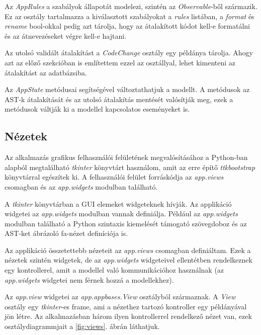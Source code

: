 Az \emph{AppRules} a szabályok állapotát modelezi, szintén az \emph{Observable}-ből
származik.
Ez az osztály tartalmazza a kiválasztott szabályokat a \emph{rules} listában,
a \emph{format} és \emph{rename} bool-okkal pedig azt tárolja, hogy az átalakított
kódot kell-e formatálni és az átnevezéseket végre kell-e hajtani.

\pagebreak

Az utolsó validált átalakítást a \emph{CodeChange} osztály egy példánya tárolja.
Ahogy azt az előző szekcióban is említettem ezzel az osztállyal,
lehet kimenteni az átalakítást az adatbázsiba.

Az \emph{AppState} metódusai segítségével változtathatjuk a modellt.
A metódusok az AST-k átalakítását és az utolsó átalakítás mentését valósítják meg,
ezek a metódusok váltják ki a modellel kapcsolatos eseményeket is.

\subsection{Nézetek}

Az alkalmazás grafikus felhasználói felületének megvalósításához
a Python-ban alapból megtalálható
\emph{tkinter} könyvtárt használom, amit az erre építő \emph{ttkbootstrap} könyvtárral
egészítek ki.
A felhasználói felület forráskódja az \emph{app.views} csomagban és az \emph{app.widgets}
modulban található.

A \emph{tkinter} könyvtárban a GUI elemeket widgeteknek hívják.
Az applikáció widgetei az \emph{app.widgets} modulban vannak definiálja.
Például az \emph{app.widgets} modulban található
a Python szintaxis kiemelését támogató szövegdoboz
és az AST-ket ábrázoló fa-nézet definíciója is.

Az applikáció összetettebb nézeteit az \emph{app.views} csomagban definiáltam.
Ezek a nézetek szintén widgetek,
de az \emph{app.widgets} widgeteivel ellentétben
rendelkeznek egy kontrollerel,
amit a modellel való kommunikációhoz használnak
(az \emph{app.widgets} widgetei nem férnek hozzá a modellekhez).

Az \emph{app.view} widgetei az \emph{app.appbases.View} osztályból származnak.
A \emph{View} osztály egy \emph{tkinter}-es frame, ami
a nézethez tartozó kontroller egy példányával jön létre.
Az alkalmazásban három ilyen kontrollerrel rendelkező nézet van,
ezek osztálydiagrammjait a \ref{fig:views}. ábrán láthatjuk.

